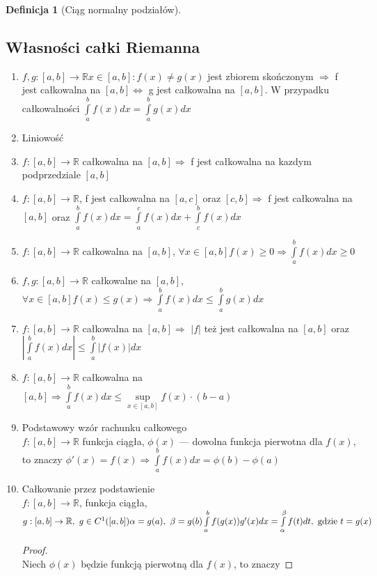 \documentclass[12pt,a4paper]{article}
\theoremstyle{definition}
\newtheorem{df}{Definicja}
\begin{document}
\begin{df}[Ciąg normalny podziałów]
\subsection{Własności całki Riemanna}

\begin{enumerate}
\item $f,g: [a,b] \to \mathbb{R} {x\in[a,b]: f(x) \neq g(x)}$ jest zbiorem skończonym $\Rightarrow$ f jest całkowalna na $[a,b]\Leftrightarrow$ g jest całkowalna na $[a,b]$. W przypadku całkowalności $\int\limits_a^bf(x)dx=\int\limits_a^bg(x)dx$
\item Liniowość
\item $f: [a,b]\to\mathbb{R}$ całkowalna na $[a,b] \Rightarrow$ f jest całkowalna na kazdym podprzedziale $[a,b]$
\item $f: [a,b]\to\mathbb{R}$, f jest całkowalna na $[a,c]$ oraz $[c,b] \Rightarrow$ f jest całkowalna na $[a,b]$ oraz $\int\limits_a^bf(x)dx = \int\limits_a^cf(x)dx + \int\limits_c^bf(x)dx$
\item $f: [a,b] \to \mathbb{R}$ całkowalna na $[a,b]$, $\forall x\in[a,b] f(x) \geq 0 \Rightarrow \int\limits_a^bf(x)dx \geq 0$
\item $f,g: [a,b] \to \mathbb{R}$ całkowalne na $[a,b]$, $\forall x\in[a,b] f(x) \leq g(x) \Rightarrow \int\limits_a^bf(x)dx \leq \int\limits_a^bg(x)dx$
\item $f: [a,b] \to \mathbb{R}$ całkowalna na $[a,b] \Rightarrow$ $|f|$ też jest całkowalna na $[a,b]$ oraz $|\int\limits_a^bf(x)dx| \leq \int\limits_a^b|f(x)|dx$
\item $f: [a,b] \to \mathbb{R}$ całkowalna na $[a,b] \Rightarrow \int\limits_a^bf(x)dx \leq \sup\limits_{x\in[a,b]}f(x)\cdot(b-a)$
\item Podstawowy wzór rachunku całkowego\\
$f: [a,b] \to \mathbb{R}$ funkcja ciągła, $\phi(x)$ --- dowolna funkcja pierwotna dla $f(x)$, to znaczy $\phi'(x)=f(x) \Rightarrow \int\limits_a^bf(x)dx = \phi(b)-\phi(a)$
\item Całkowanie przez podstawienie\\
$
f: [a,b]\to\mathbb{R}$, funkcja ciągła, $g: [a,b]\to\mathbb{R},~ g\in C^1([a,b])\\
\alpha = g(a),~ \beta =g(b)\\
\int\limits_a^bf(g(x))g'(x)dx = \int\limits_\alpha^\beta f(t)dt, \mbox{ gdzie }t = g(x)
$
\begin{proof}~\\
	Niech $\phi(x)$ będzie funkcją pierwotną dla $f(x)$, to znaczy

\end{proof}
\end{enumerate}
\end{df}
\end{document}
